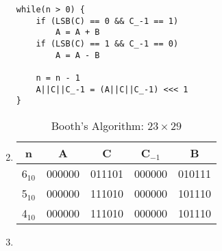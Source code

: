 \documentclass{article}
\begin{document}
\begin{enumerate}
\begin{verbatim}
while(n > 0) {
    if (LSB(C) == 0 && C_-1 == 1)
        A = A + B
    if (LSB(C) == 1 && C_-1 == 0)
        A = A - B
    
    n = n - 1
    A||C||C_-1 = (A||C||C_-1) <<< 1 
}
    \end{verbatim}
    \pagebreak

    \item
    \begin{table}[htbp]
        \centering
        \caption{Booth's Algorithm: \(23 \times 29\)}
        \begin{tabular}{c|c|c|c|c}
            n & A & C & C\(_{-1}\) & B \\
            \hline
            6\(_{10}\) & 000000 & 011101 & 000000 & 010111 \\
            5\(_{10}\) & 000000 & 111010 & 000000 & 101110 \\
            4\(_{10}\) & 000000 & 111010 & 000000 & 101110 \\
        \end{tabular}
    \end{table}
    
    \item 

\end{enumerate}
\end{document}
